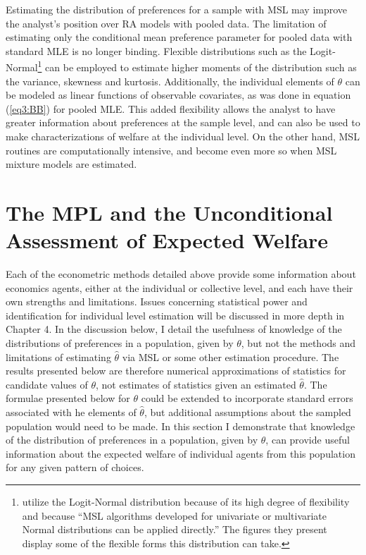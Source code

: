\documentclass[../main.tex]{subfiles}
\begin{document}
Estimating the distribution of preferences for a sample with MSL may improve the analyst's position over RA models with pooled data.
The limitation of estimating only the conditional mean preference parameter for pooled data with standard MLE is no longer binding.
Flexible distributions such as the Logit-Normal\footnote{
	\textcite[82]{Andersen2012} utilize the Logit-Normal distribution because of its high degree of flexibility and because \enquote{MSL algorithms developed for univariate or multivariate Normal distributions can be applied directly.}
	The figures they present \parencite*[83]{Andersen2012} display some of the flexible forms this distribution can take.
} can be employed to estimate higher moments of the distribution such as the variance, skewness and kurtosis.
Additionally, the individual elements of $\theta$ can be modeled as linear functions of observable covariates, as was done in equation (\ref{eq3:BB}) for pooled MLE.
This added flexibility allows the analyst to have greater information about preferences at the sample level, and can also be used to make characterizations of welfare at the individual level.
On the other hand, MSL routines are computationally intensive, and become even more so when MSL mixture models are estimated.

\singlespacing
\section{The \texorpdfstring{\textcite{Holt2002}}{Holt and Laury (2002)} MPL and the Unconditional Assessment of Expected Welfare}
\doublespacing

Each of the econometric methods detailed above provide some information about economics agents, either at the individual or collective level, and each have their own strengths and limitations.
Issues concerning statistical power and identification for individual level estimation will be discussed in more depth in Chapter 4.
In the discussion below, I detail the usefulness of knowledge of the distributions of preferences in a population, given by $\theta$, but not the methods and limitations of estimating $\hat{\theta}$ via MSL or some other estimation procedure.
The results presented below are therefore numerical approximations of statistics for candidate values of $\theta$, not estimates of statistics given an estimated $\hat{\theta}$.
The formulae presented below for $\theta$ could be extended to incorporate standard errors associated with he elements of $\hat{\theta}$, but additional assumptions about the sampled population would need to be made.
In this section I demonstrate that knowledge of the distribution of preferences in a population, given by $\theta$, can provide useful information about the expected welfare of individual agents from this population for any given pattern of choices.
\end{document}
